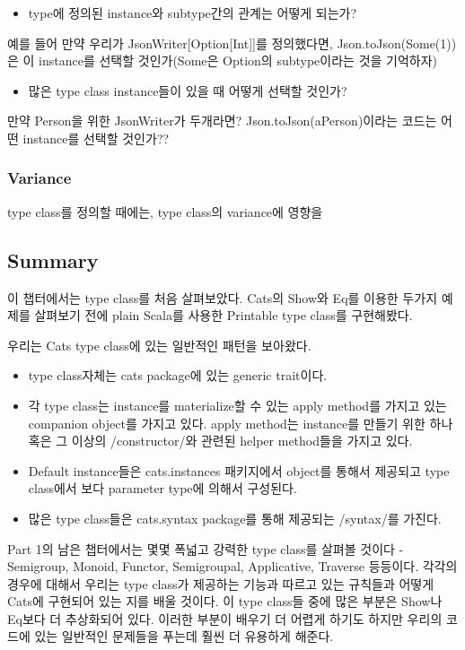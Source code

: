 \documentclass[a4paper]{article}
\begin{document}
\begin{itemize}
\item type에 정의된 instance와 subtype간의 관계는 어떻게 되는가?
\end{itemize}
예를 들어 만약 우리가 JsonWriter[Option[Int]]를 정의했다면, Json.toJson(Some(1))은 이 instance를 선택할 것인가(Some은 Option의 subtype이라는 것을 기억하자)
\begin{itemize}
\item 많은 type class instance들이 있을 때 어떻게 선택할 것인가?
\end{itemize}
만약 Person을 위한 JsonWriter가 두개라면? Json.toJson(aPerson)이라는 코드는 어떤 instance를 선택할 것인가??

\subsubsection{Variance}
\label{sec:org6436cb0}
type class를 정의할 때에는, type class의 variance에 영향을 

\subsection{Summary}
\label{sec:orgda2e1f2}
이 챕터에서는 type class를 처음 살펴보았다. Cats의 Show와 Eq를 이용한 두가지 예제를 살펴보기 전에 plain Scala를 사용한 Printable type class를 구현해봤다.

우리는 Cats type class에 있는 일반적인 패턴을 보아왔다.
\begin{itemize}
\item type class자체는 cats package에 있는 generic trait이다.
\item 각 type class는 instance를 materialize할 수 있는 apply method를 가지고 있는 companion object를 가지고 있다. apply method는 instance를 만들기 위한 하나 혹은 그 이상의 /constructor/와 관련된 helper method들을 가지고 있다.
\item Default instance들은 cats.instances 패키지에서 object를 통해서 제공되고 type class에서 보다 parameter type에 의해서 구성된다.
\item 많은 type class들은 cats.syntax package를 통해 제공되는 /syntax/를 가진다.
\end{itemize}

Part 1의 남은 챕터에서는 몇몇 폭넓고 강력한 type class를 살펴볼 것이다 - Semigroup, Monoid, Functor, Semigroupal, Applicative, Traverse 등등이다. 각각의 경우에 대해서 우리는 type class가 제공하는 기능과 따르고 있는 규칙들과 어떻게 Cats에 구현되어 있는 지를 배울 것이다. 이 type class들 중에 많은 부분은 Show나 Eq보다 더 추상화되어 있다. 이러한 부분이 배우기 더 어렵게 하기도 하지만 우리의 코드에 있는 일반적인 문제들을 푸는데 훨씬 더 유용하게 해준다.
\end{document}
